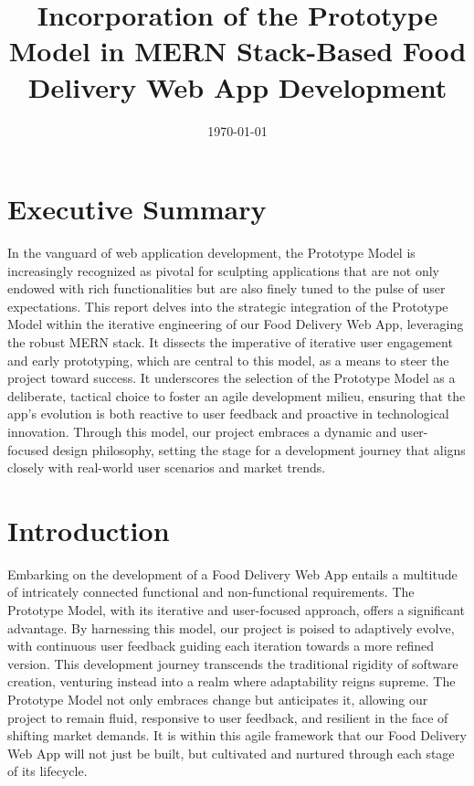 \documentclass{article}
\title{Incorporation of the Prototype Model in MERN Stack-Based Food Delivery Web App Development}
\date{\today}
\begin{document}
\maketitle

\section*{Executive Summary}
In the vanguard of web application development, the Prototype Model is increasingly recognized as pivotal for sculpting applications that are not only endowed with rich functionalities but are also finely tuned to the pulse of user expectations. This report delves into the strategic integration of the Prototype Model within the iterative engineering of our Food Delivery Web App, leveraging the robust MERN stack. It dissects the imperative of iterative user engagement and early prototyping, which are central to this model, as a means to steer the project toward success. It underscores the selection of the Prototype Model as a deliberate, tactical choice to foster an agile development milieu, ensuring that the app's evolution is both reactive to user feedback and proactive in technological innovation. Through this model, our project embraces a dynamic and user-focused design philosophy, setting the stage for a development journey that aligns closely with real-world user scenarios and market trends.

\section{Introduction}
Embarking on the development of a Food Delivery Web App entails a multitude of intricately connected functional and non-functional requirements. The Prototype Model, with its iterative and user-focused approach, offers a significant advantage. By harnessing this model, our project is poised to adaptively evolve, with continuous user feedback guiding each iteration towards a more refined version. This development journey transcends the traditional rigidity of software creation, venturing instead into a realm where adaptability reigns supreme. The Prototype Model not only embraces change but anticipates it, allowing our project to remain fluid, responsive to user feedback, and resilient in the face of shifting market demands. It is within this agile framework that our Food Delivery Web App will not just be built, but cultivated and nurtured through each stage of its lifecycle.
\end{document}
